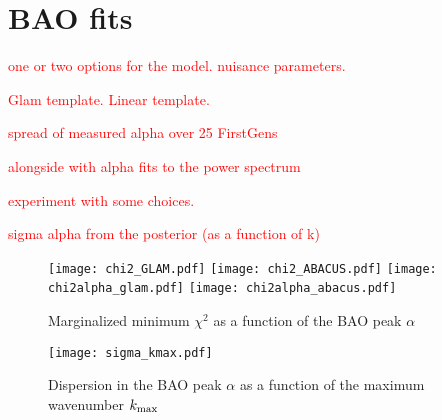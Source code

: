 \section{BAO fits}
\label{sec:fits}

\textcolor{red}{one or two options for the model. nuisance parameters.}

\textcolor{red}{Glam template. Linear template.}

\textcolor{red}{spread of measured alpha over 25 FirstGens}

\textcolor{red}{alongside with alpha fits to the power spectrum}

\textcolor{red}{experiment with some choices.}

\textcolor{red}{sigma alpha from the posterior (as a function of k)}

\begin{figure*}
\texttt{[image: chi2\_GLAM.pdf]}
\texttt{[image: chi2\_ABACUS.pdf]}
\texttt{[image: chi2alpha\_glam.pdf]}
\texttt{[image: chi2alpha\_abacus.pdf]}
\caption{Marginalized minimum $\chi^{2}$ as a function of the BAO peak $\alpha$}\label{fig:chi2alpha}
\end{figure*}

\begin{figure*}
\texttt{[image: sigma\_kmax.pdf]}
\caption{Dispersion in the BAO peak $\alpha$ as a function of the maximum wavenumber $k_{\rm max}$}
\end{figure*}